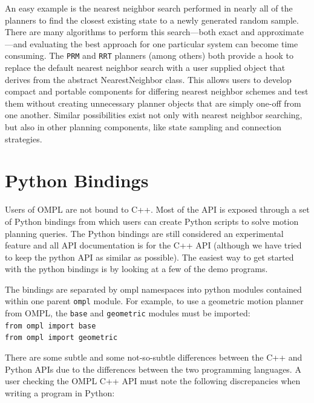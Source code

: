An easy example is the nearest neighbor search performed in nearly all of the
planners to find the closest existing state to a newly generated random sample.
There are many algorithms to perform this search---both exact and
approximate---and evaluating the best approach for one particular system can become time
consuming.  The {\tt PRM} and {\tt RRT} planners (among others) both provide a
hook to replace the default nearest neighbor search with a user supplied
object that derives from the abstract NearestNeighbor class.  This allows users
to develop compact and portable components for differing nearest neighbor
schemes and test them without creating unnecessary planner objects that are
simply one-off from one another.  Similar possibilities exist not only with
nearest neighbor searching, but also in other planning components, like state
sampling and connection strategies.

\section {Python Bindings}
Users of OMPL are not bound to C++.  Most of the API is exposed through a set
of Python bindings from which users can create Python scripts to solve motion
planning queries. The
Python bindings are still considered an experimental feature and all API
documentation is for the C++ API (although we have tried to keep the python API
as similar as possible). The easiest way to get started with the python bindings
is by looking at a few of the demo programs.

The bindings are separated by ompl namespaces into python modules contained
within one parent {\tt ompl} module.  For example, to use a geometric motion
planner from OMPL, the {\tt base} and {\tt geometric} modules must be imported:
\\
{\tt from ompl import base\\
from ompl import geometric}

There are some subtle and some not-so-subtle differences between the C++ and
Python APIs due to the differences between the two programming languages.  A
user checking the OMPL C++ API must note the following discrepancies when
writing a program in Python:


